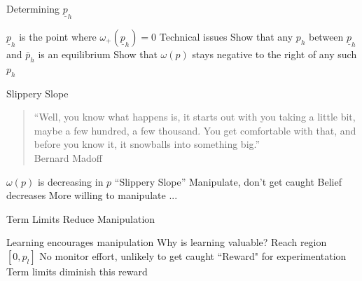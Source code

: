 \documentclass[usenames,dvipsnames]{beamer}
\newcommand{\bo}{\begin{outline}}
\newcommand{\eo}{\end{outline}}
\begin{document}
\begin{frame}{Determining $\underline{p}_h$}\label{frame:End-Eq-Constr}
\bo
\1 $\underline{p}_h$ is the point where $\omega_{+}(\underline{p}_h)=0$
\1 Technical issues
\2 Show that any $p_h$ between $\underline{p}_h$ and $\bar{p}_h$ is an equilibrium
\2 Show that $\omega(p)$ stays negative to the right of any such $p_h$
\eo
\bigskip
\hfill \hyperlink{frame:Small-R}{}
\end{frame}


\begin{frame}{Slippery Slope}
\begin{quote}
        ``Well, you know what happens is, it starts out with you taking a little bit, maybe a few hundred, a few thousand. You get comfortable with that, and before you know it, it snowballs into something big.'' \\ \hfill Bernard Madoff
\end{quote}
\bo
\1 $\omega(p)$ is decreasing in $p$
\1 ``Slippery Slope''
\2 Manipulate, don't get caught
\2 Belief decreases
\2 More willing to manipulate
\2 ...
\eo
\end{frame}

\begin{frame}{Term Limits Reduce Manipulation}
\bo
\1 Learning encourages manipulation
\1 Why is learning valuable?
\2 Reach region $[0,p_l]$
\2 No monitor effort, unlikely to get caught
\2 ``Reward" for experimentation
\1 Term limits diminish this reward
\eo 
\end{frame}
\end{document}

